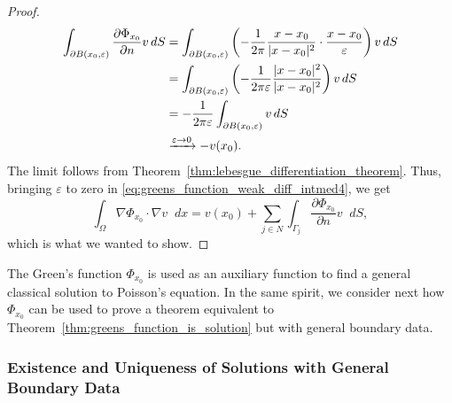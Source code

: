 \documentclass[english, 12pt, a4paper, sci, utf8, a-2b, online]{aaltothesis}
\theoremstyle{definition}
\theoremstyle{plain}
\DeclarePairedDelimiter\abs{\lvert}{\rvert}
\newcommand*\diff{\mathop{}\!d}
\numberwithin{equation}{section}
\begin{document}
\begin{proof}
\begin{align*}
        \int_{\partial B(x_0,\varepsilon)}
            \frac{\partial \Phi_{x_0}}{\partial n} v \diff S
        &= \int_{\partial B(x_0,\varepsilon)}
            \left(-\frac{1}{2\pi} \frac{x-x_0}{\abs{x-x_0}^2} \cdot
                \frac{x-x_0}{\varepsilon} \right) v \diff S \\
        &= \int_{\partial B(x_0,\varepsilon)}
            \left(-\frac{1}{2\pi\varepsilon} \frac{\abs{x-x_0}^2}{\abs{x-x_0}^2}
                \right) v \diff S \\
        &= -\frac{1}{2\pi\varepsilon} \int_{\partial B(x_0,\varepsilon)}
            v \diff S \\
        &\xrightarrow[]{\varepsilon \to 0} -v(x_0).
    \end{align*}
    The limit follows from Theorem~\ref{thm:lebesgue_differentiation_theorem}.
    Thus, bringing $\varepsilon$ to zero in 
    \eqref{eq:greens_function_weak_diff_intmed4}, we get
    \begin{equation*}
        \int_{\Omega} \nabla \Phi_{x_0} \cdot \nabla v \diff x
        = v(x_0) + \sum_{j \in N} \int_{\Gamma_j}
            \frac{\partial \Phi_{x_0}}{\partial n} v \diff S,
    \end{equation*}
    which is what we wanted to show.
\end{proof}

The Green's function $\Phi_{x_0}$ is used as an auxiliary
function to find a general classical solution to Poisson's equation.
In the same spirit, we consider next how $\Phi_{x_0}$ can be used to prove
a theorem equivalent to Theorem~\ref{thm:greens_function_is_solution} but
with general boundary data.

\subsubsection{Existence and Uniqueness of Solutions with General Boundary Data}
\label{subsubsec:existence_and_uniqueness_of_solutions_with_arbitrary_data}
\end{document}
